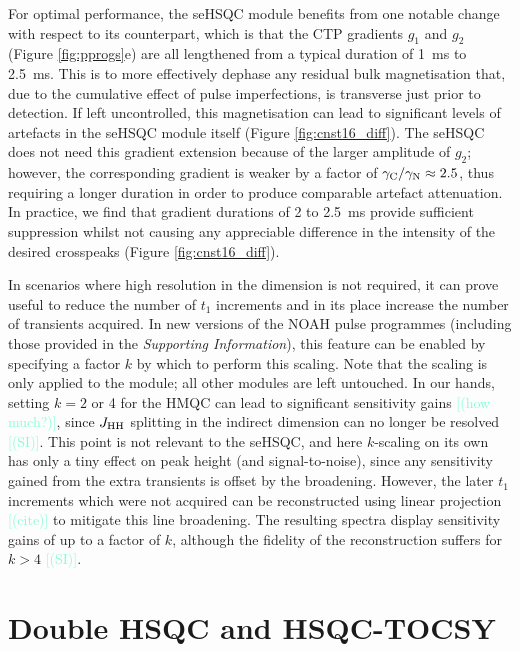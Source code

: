 \documentclass[draft,11pt]{article}
\newcommand*{\carbon}{\ce{^{13}C}}
\newcommand*{\nitrogen}{\ce{^{15}N}}
\newcommand*{\hl}[1]{\textcolor{Aquamarine}{[#1]}}
\newcommand*{\jhh}{J_{\ce{HH}}}
\newcommand*{\figref}[1]{Figure \ref{fig:#1}}
\newcommand*{\SInf}{\textit{Supporting Information}}
\newcommand*{\sitodo}{\hl{(SI)}}
\begin{document}
For optimal performance, the \nitrogen{} seHSQC module benefits from one notable change with respect to its \carbon{} counterpart, which is that the CTP gradients $g_1$ and $g_2$ (\figref{pprogs}e) are all lengthened from a typical duration of \SI{1}{\ms} to \SI{2.5}{\ms}.
This is to more effectively dephase any residual bulk magnetisation that, due to the cumulative effect of pulse imperfections, is transverse just prior to detection.
If left uncontrolled, this magnetisation can lead to significant levels of artefacts in the seHSQC module itself (\figref{cnst16_diff}).
The \carbon{} seHSQC does not need this gradient extension because of the larger amplitude of $g_2$; however, the corresponding \nitrogen{} gradient is weaker by a factor of $\gamma_{\ce{C}}/\gamma_{\ce{N}} \approx 2.5$, thus requiring a longer duration in order to produce comparable artefact attenuation.
In practice, we find that gradient durations of 2 to \SI{2.5}{\ms} provide sufficient suppression whilst not causing any appreciable difference in the intensity of the desired crosspeaks (\figref{cnst16_diff}).

In scenarios where high resolution in the \nitrogen{} dimension is not required, it can prove useful to reduce the number of $t_1$ increments and in its place increase the number of transients acquired.\autocite{Perez-Trujillo2007MRC, Parella2010CMR}
In new versions of the NOAH pulse programmes (including those provided in the \SInf{}), this feature can be enabled by specifying a factor $k$ by which to perform this scaling.
Note that the scaling is only applied to the \nitrogen{} module; all other modules are left untouched.
In our hands, setting $k = 2$ or 4 for the \nitrogen{} HMQC can lead to significant sensitivity gains \hl{(how much?)}, since $\jhh$ splitting in the indirect dimension can no longer be resolved \sitodo{}.
This point is not relevant to the seHSQC, and here $k$-scaling on its own has only a tiny effect on peak height (and signal-to-noise), since any sensitivity gained from the extra transients is offset by the broadening.
However, the later $t_1$ increments which were not acquired can be reconstructed using linear projection \hl{(cite)} to mitigate this line broadening.
The resulting spectra display sensitivity gains of up to a factor of $k$, although the fidelity of the reconstruction suffers for $k > 4$ \sitodo.

\section*{Double HSQC and HSQC-TOCSY}
\end{document}
